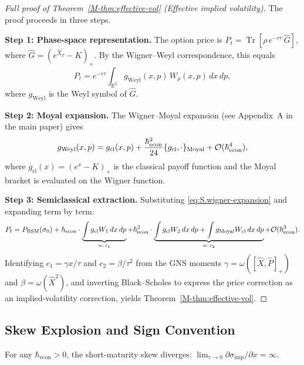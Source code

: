 \begin{proof}[Full proof of Theorem~\ref{M-thm:effective-vol} (Effective implied volatility)]
The proof proceeds in three steps.

\textbf{Step 1: Phase-space representation.}
The option price is
$P_t = \operatorname{Tr}[\rho \, e^{-r\tau} \, \hat{G}]$, where
$\hat{G} = (e^{\hat{X}_T} - K)_+$.
By the Wigner--Weyl correspondence, this equals
\begin{equation*}
    P_t = e^{-r\tau} \int_{\mathbb{R}^2} g_{\mathrm{Weyl}}(x, p)
    \, W_\rho(x, p) \, dx \, dp,
\end{equation*}
where $g_{\mathrm{Weyl}}$ is the Weyl symbol of $\hat{G}$.

\textbf{Step 2: Moyal expansion.}
The Wigner--Moyal expansion (see Appendix~A in the main paper) gives
\begin{equation*}
    g_{\mathrm{Weyl}}(x, p) = g_{\mathrm{cl}}(x, p)
    + \frac{\hbar_{\mathrm{econ}}^2}{24} \{ g_{\mathrm{cl}}, \cdot \}_{\mathrm{Moyal}}
    + \mathcal{O}(\hbar_{\mathrm{econ}}^4),
\end{equation*}
where $g_{\mathrm{cl}}(x) = (e^x - K)_+$ is the classical payoff function
and the Moyal bracket is evaluated on the Wigner function.

\textbf{Step 3: Semiclassical extraction.}
Substituting \eqref{eq:S.wigner-expansion} and expanding term by term:
\begin{equation*}
    P_t = P_{\mathrm{BSM}}(\sigma_0)
    + \hbar_{\mathrm{econ}} \cdot \underbrace{\int g_{\mathrm{cl}} W_1 \, dx\, dp}_{=:\, c_1}
    + \hbar_{\mathrm{econ}}^2 \cdot \underbrace{\int g_{\mathrm{cl}} W_2 \, dx\, dp
    + \int g_{\mathrm{Moyal}} W_{\mathrm{cl}} \, dx\, dp}_{=:\, c_2}
    + \mathcal{O}(\hbar_{\mathrm{econ}}^3).
\end{equation*}
Identifying $c_1 = \gamma x / \tau$ and $c_2 = \beta / \tau^2$ from the GNS
moments $\gamma = \omega([\hat{X}, \hat{P}]_+)$ and $\beta = \omega(\hat{X}^2)$,
and inverting Black--Scholes to express the price correction as an implied-volatility
correction, yields Theorem~\ref{M-thm:effective-vol}.
\end{proof}

\subsection{Skew Explosion and Sign Convention}
\label{sec:S1-skew}

\begin{corollary}
For any $\hbar_{\mathrm{econ}} > 0$, the short-maturity skew diverges:
$\lim_{\tau \to 0} \partial \sigma_{\mathrm{imp}} / \partial x = \infty.$
\end{corollary}

